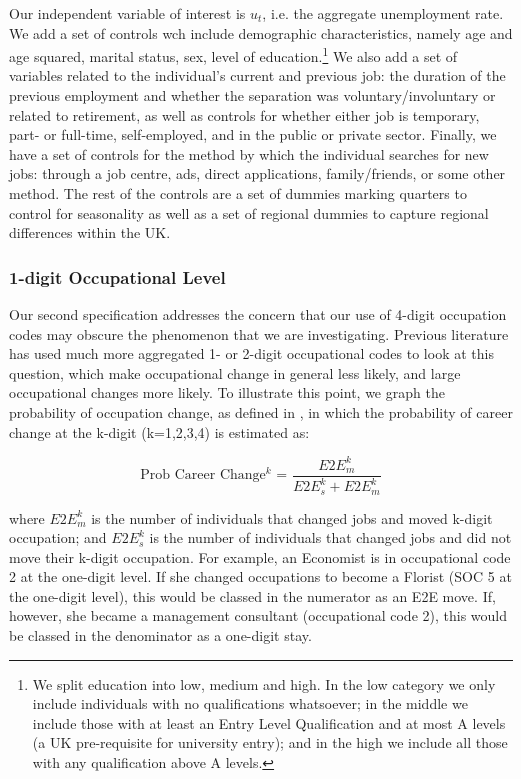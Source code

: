 \documentclass[11pt, oneside]{article}
\begin{document}
\vspace{2mm}

Our independent variable of interest is $u_{t}$, i.e. the aggregate unemployment rate. We add a set of controls wch include demographic characteristics, namely age and age squared, marital status, sex, level of education.\footnote{We split education into low, medium and high. In the low category we only include individuals with no qualifications whatsoever; in the middle we include those with at least an Entry Level Qualification and at most A levels (a UK pre-requisite for university entry); and in the high we include all those with any qualification above A levels.} We also add a set of variables related to the individual's current and previous job: the duration of the previous employment and whether the separation was voluntary/involuntary or related to retirement, as well as controls for whether either job is temporary, part- or full-time, self-employed, and in the public or private sector. Finally, we have a set of controls for the method by which the individual searches for new jobs: through a job centre, ads, direct applications, family/friends, or some other method. The rest of the controls are a set of dummies marking quarters to control for seasonality as well as a set of regional dummies to capture regional differences within the UK.

\subsubsection{1-digit Occupational Level}

Our second specification addresses the concern that our use of 4-digit occupation codes may obscure the phenomenon that we are investigating. Previous literature has used much more aggregated 1- or 2-digit occupational codes to look at this question, which make occupational change in general less likely, and large occupational changes more likely. To illustrate this point, we graph the probability of occupation change, as defined in \cite{Carrillo-Tudela2016}, in which the probability of career change at the k-digit (k=1,2,3,4) is estimated as:

\begin{equation*}
\text{Prob Career Change$^{k}$ = } \frac{E2E^{k}_m}{E2E^{k}_s + E2E^{k}_m}
\end{equation*}

\noindent where $E2E^{k}_m$ is the number of individuals that changed jobs and moved k-digit occupation; and $E2E^{k}_s$ is the number of individuals that changed jobs and did not move their k-digit occupation. For example, an Economist is in occupational code 2 at the one-digit level. If she changed occupations to become a Florist (SOC 5 at the one-digit level), this would be classed in the numerator as an E2E move. If, however, she became a management consultant (occupational code 2), this would be classed in the denominator as a one-digit stay.
\end{document}

